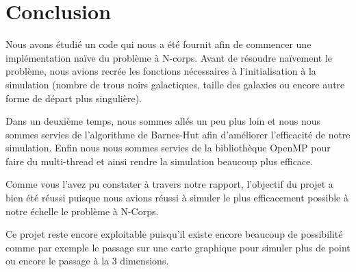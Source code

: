 \chapter{Conclusion}

\par Nous avons étudié un code qui nous a été fournit afin de commencer une implémentation naïve du problème à N-corps. Avant de résoudre naïvement le problème, nous avions recrée les fonctions nécessaires à l'initialisation  à la simulation (nombre de trous noirs galactiques, taille des galaxies ou encore autre forme de départ plus singulière).
\par Dans un deuxième temps, nous sommes allés un peu plus loin et nous nous sommes servies de l'algorithme de Barnes-Hut afin d'améliorer l'efficacité de notre simulation. Enfin nous nous sommes servies de la bibliothèque OpenMP pour faire du multi-thread et ainsi rendre la simulation beaucoup plus efficace.
\par Comme vous l'avez pu constater à travers notre rapport, l’objectif du projet a bien été réussi puisque nous avions réussi à simuler le plus efficacement possible à notre échelle le problème à N-Corps.
\par Ce projet reste encore exploitable puisqu’il existe encore beaucoup de possibilité comme par exemple le passage sur une carte graphique pour simuler plus de point ou encore le passage à la 3 dimensions.
